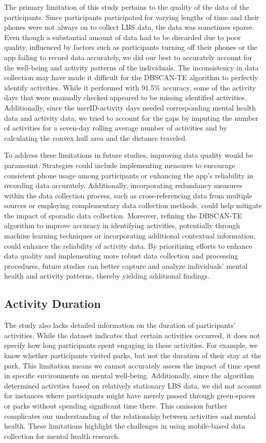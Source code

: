 \documentclass[
  letterpaper,
  number,
  review,
  3p]{elsarticle}
\begin{document}
The primary limitation of this study pertains to the quality of the data
of the participants. Since participants participated for varying lengths
of time and their phones were not always on to collect LBS data, the
data was sometimes sparse. Even though a substantial amount of data had
to be discarded due to poor quality, influenced by factors such as
participants turning off their phones or the app failing to record data
accurately, we did our best to accurately account for the well-being and
activity patterns of the individuals. The inconsistency in data
collection may have made it difficult for the DBSCAN-TE algorithm to
perfectly identify activities. While it performed with 91.5\% accuracy,
some of the activity days that were manually checked appeared to be
missing identified activities. Additionally, since the userID-activity
days needed corresponding mental health data and activity data, we tried
to account for the gaps by imputing the number of activities for a
seven-day rolling average number of activities and by calculating the
convex hull area and the distance traveled.

To address these limitations in future studies, improving data quality
would be paramount. Strategies could include implementing measures to
encourage consistent phone usage among participants or enhancing the
app's reliability in recording data accurately. Additionally,
incorporating redundancy measures within the data collection process,
such as cross-referencing data from multiple sources or employing
complementary data collection methods, could help mitigate the impact of
sporadic data collection. Moreover, refining the DBSCAN-TE algorithm to
improve accuracy in identifying activities, potentially through machine
learning techniques or incorporating additional contextual information,
could enhance the reliability of activity data. By prioritizing efforts
to enhance data quality and implementing more robust data collection and
processing procedures, future studies can better capture and analyze
individuals' mental health and activity patterns, thereby yielding
additional findings.

\subsection{Activity Duration}\label{activity-duration}

The study also lacks detailed information on the duration of
participants' activities. While the dataset indicates that certain
activities occurred, it does not specify how long participants spent
engaging in these activities. For example, we know whether participants
visited parks, but not the duration of their stay at the park. This
limitation means we cannot accurately assess the impact of time spent in
specific environments on mental well-being. Additionally, since the
algorithm determined activities based on relatively stationary LBS data,
we did not account for instances where participants might have merely
passed through green-spaces or parks without spending significant time
there. This omission further complicates our understanding of the
relationship between activities and mental health. These limitations
highlight the challenges in using mobile-based data collection for
mental health research.
\end{document}
